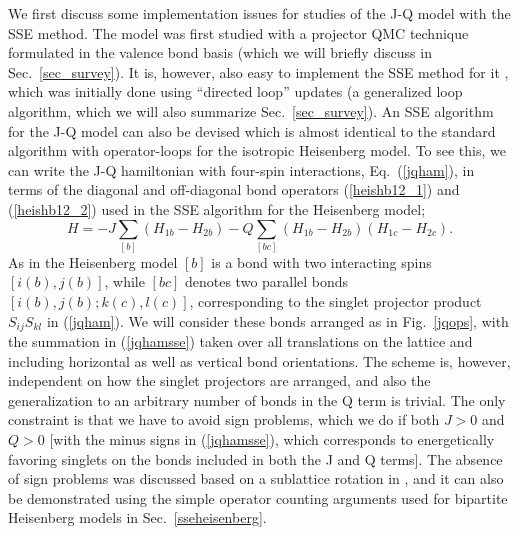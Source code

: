 \documentclass[draft,numberedheadings]{aipproc}
\begin{document}
We first discuss some implementation issues for studies of the J-Q model with the SSE method.
The model was first studied with a projector QMC technique formulated in the valence bond basis (which we will briefly discuss in 
Sec.~\ref{sec_survey}). It is, however, also easy to implement the SSE method for it \cite{melko08a}, which was initially done using 
``directed loop'' updates (a generalized loop algorithm, which we will also summarize Sec.~\ref{sec_survey}). An SSE algorithm for the J-Q 
model can also be devised which is almost identical to the standard algorithm with operator-loops for the isotropic Heisenberg model. 
To see this, we can write the J-Q hamiltonian with four-spin interactions, Eq.~(\ref{jqham}), in terms of the diagonal and off-diagonal bond 
operators (\ref{heishb12_1})  and (\ref{heishb12_2}) used in the SSE algorithm for the Heisenberg model;
\begin{equation}
H = -J\sum_{[b]}(H_{1b}-H_{2b}) -Q\sum_{[bc]}(H_{1b}-H_{2b})(H_{1c}-H_{2c}).
\label{jqhamsse}
\end{equation}
As in the Heisenberg model $[b]$ is a bond with two interacting spins $[i(b),j(b)]$, while $[bc]$ denotes two parallel bonds $[i(b),j(b); k(c),l(c)]$,
corresponding to the singlet projector product $S_{ij}S_{kl}$ in (\ref{jqham}). We will consider these bonds arranged as in Fig.~\ref{jqops}, with the 
summation in (\ref{jqhamsse}) taken over all translations on the lattice and including horizontal as well as vertical bond orientations. The scheme 
is, however, independent on how the singlet projectors are arranged, and also the generalization to an arbitrary number of bonds in the Q term is 
trivial. The only constraint is that we have to avoid sign problems, which we do if both $J>0$ and $Q>0$ [with the minus signs in (\ref{jqhamsse}), 
which corresponds to energetically favoring singlets on the bonds included in both the J and Q terms]. The absence of sign problems was discussed
based on a sublattice rotation in \cite{melko08a}, and it can also be demonstrated using the simple operator counting arguments used for bipartite 
Heisenberg models in Sec.~\ref{sseheisenberg}.
\end{document}
